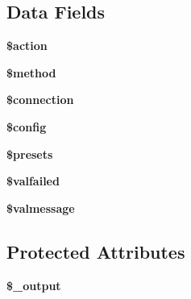 \subsection*{Data Fields}
\begin{DoxyCompactItemize}
\item 
\hypertarget{classg_form_boot_strap_aa698a3e72116e8e778be0e95d908ee30}{{\bfseries \$action}}\label{classg_form_boot_strap_aa698a3e72116e8e778be0e95d908ee30}

\item 
\hypertarget{classg_form_boot_strap_a12661b2fc0f57f97e30a1620889ce9c6}{{\bfseries \$method}}\label{classg_form_boot_strap_a12661b2fc0f57f97e30a1620889ce9c6}

\item 
\hypertarget{classg_form_boot_strap_a0d9c79b9b86b3f5891c6d3892f12c6a0}{{\bfseries \$connection}}\label{classg_form_boot_strap_a0d9c79b9b86b3f5891c6d3892f12c6a0}

\item 
\hypertarget{classg_form_boot_strap_a49c7011be9c979d9174c52a8b83e5d8e}{{\bfseries \$config}}\label{classg_form_boot_strap_a49c7011be9c979d9174c52a8b83e5d8e}

\item 
\hypertarget{classg_form_boot_strap_ab1e2044844933970d1f1463832c0a689}{{\bfseries \$presets}}\label{classg_form_boot_strap_ab1e2044844933970d1f1463832c0a689}

\item 
\hypertarget{classg_form_boot_strap_ae23174ae7472be28c3b4d1e11864da99}{{\bfseries \$valfailed}}\label{classg_form_boot_strap_ae23174ae7472be28c3b4d1e11864da99}

\item 
\hypertarget{classg_form_boot_strap_af7fa52ab3124672ea860fed81a169938}{{\bfseries \$valmessage}}\label{classg_form_boot_strap_af7fa52ab3124672ea860fed81a169938}

\end{DoxyCompactItemize}
\subsection*{Protected Attributes}
\begin{DoxyCompactItemize}
\item 
\hypertarget{classg_form_boot_strap_a9d0ae9d0264ebd1aba5a9ca6c7385169}{{\bfseries \$\-\_\-output}}\label{classg_form_boot_strap_a9d0ae9d0264ebd1aba5a9ca6c7385169}

\end{DoxyCompactItemize}
